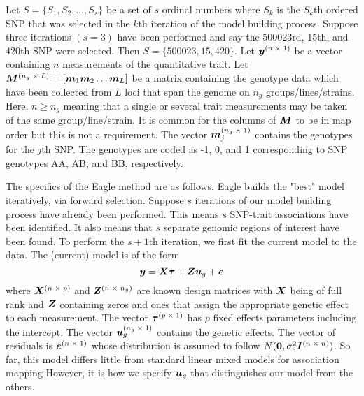 \documentclass{nature}
\begin{document}
Let $S = \{ S_1, S_2, \ldots, S_s\}$ be a set of $s$ ordinal numbers where $S_k$ is the $S_k$th ordered SNP that was 
selected in the $k$th iteration of the model building process. Suppose three iterations  $(s=3)$
have been performed and say the 500023rd, 15th, and 420th
SNP were selected. Then $S=\{500023, 15, 420\}$. 
Let $\bm{y}^{(n \; \times \;1)}$ be a vector containing $n$ measurements of the quantitative trait. 
Let $\bm{M}^{(n_g \; \times \; L)} = [\bm{m}_1 \bm{m}_2 \ldots \bm{m}_L]$ be a matrix containing the genotype data which have been collected 
from $L$ loci that span the genome on $n_g$ groups/lines/strains.  Here, $n \geq n_g$ meaning that a single or several trait measurements 
may be taken of the same group/line/strain. 
 It is common for the columns of $\bm{M}$ to be in map order but this is not a requirement. 
The vector $\bm{m}_j^{(n_g \; \times \; 1)}$ contains the genotypes for the $j$th SNP. 
The genotypes are coded as -1, 0, and 1 corresponding to SNP genotypes AA, AB, and BB, respectively. 

The specifics of the Eagle method are as follows. 
Eagle builds the "best" model iteratively, via forward selection. 
Suppose $s$ iterations of our model building process have already been performed. This means $s$ SNP-trait 
associations have been identified.  It also means that $s$ separate genomic regions of interest have been found.  
To perform the $s+1$th  iteration, we first fit the current model to the data. 
The (current) model is of the form 
\begin{equation}
\label{eq1}
\bm{y} = \bm{X} \bm{\tau} + \bm{Z} \bm{u}_g + \bm{e}
\end{equation}
where 
$\bm{X}^{(n \; \times \; p)}$ and $\bm{Z}^{( n \; \times \; n_g)}$ are known design matrices with $\bm{X}$ being of full rank and $\bm{Z}$ 
containing zeros and ones that assign the appropriate genetic effect to each measurement. 
The vector 
$\bm{\tau}^{(p \; \times \; 1)}$ has $p$ fixed effects parameters including the intercept. The vector 
$\bm{u}_g^{(n_g \; \times \; 1)}$ contains the 
genetic effects. The vector of residuals is 
$\bm{e}^{(n \; \times \;1)}$ whose distribution is assumed to follow $N(\bm{0}, \sigma^2_e \bm{I}^{(n \; \times \; n)})$. 
So far,  this model differs little from standard linear mixed models for association mapping \cite{yu2006unified,zhao2007arabidopsis} 
However, 
it is how we specify $\bm{u}_g$ that distinguishes our model from the others. 
\end{document}
